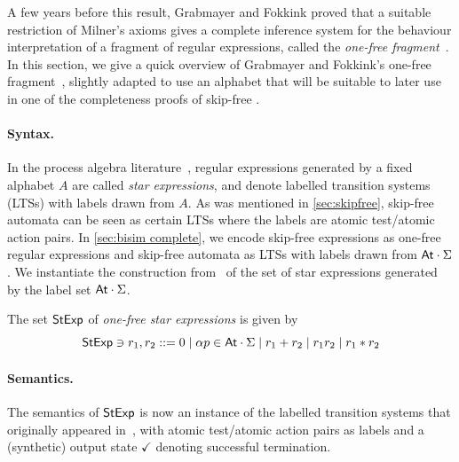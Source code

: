 \documentclass[orivec,envcountsect,envcountsame]{llncs}
\begin{document}
    A few years before this result, Grabmayer and Fokkink proved that a suitable restriction of Milner's axioms gives a complete inference system for the behaviour interpretation of a fragment of regular expressions, called the \emph{one-free fragment}~\cite{onefreeregexlics}.
    In this section, we give a quick overview of Grabmayer and Fokkink's one-free fragment~\cite{onefreeregexlics}, slightly adapted to use an alphabet that will be suitable to later use in one of the completeness proofs of skip-free \GKAT. %

    \paragraph*{\bf Syntax.}
    In the process algebra literature~\cite{milner,onefreeregexlics,regexlics}, regular expressions generated by a fixed alphabet \(A\) are called \emph{star expressions}, and denote labelled transition systems (LTSs) with labels drawn from \(A\).
    As was mentioned in \cref{sec:skipfree}, skip-free automata can be seen as certain LTSs where the labels are atomic test/atomic action pairs.
    In \cref{sec:bisim complete}, we encode skip-free \GKAT expressions as one-free regular expressions and skip-free automata as LTSs with labels drawn from \(\mathsf{At} \cdot \Sigma\).
    We instantiate the construction from~\cite{onefreeregexlics} of the set of star expressions generated by the label set \(\mathsf{At} \cdot \Sigma\).

    \begin{definition}
        The set \(\mathsf{StExp}\) of \emph{one-free star expressions} is given by
        \[
            \mathsf{StExp} \ni r_1, r_2 ::= 0 \mid \alpha p \in \mathsf{At} \cdot \Sigma \mid r_1 + r_2 \mid r_1r_2 \mid r_1 * r_2
        \]
    \end{definition}

    \paragraph*{\bf Semantics.}
    The semantics of $\mathsf{StExp}$ is now an instance of the labelled transition systems that originally appeared in~\cite{onefreeregexlics}, with atomic test/atomic action pairs as labels and a (synthetic) output state \(\checkmark\) denoting successful termination.
\end{document}
